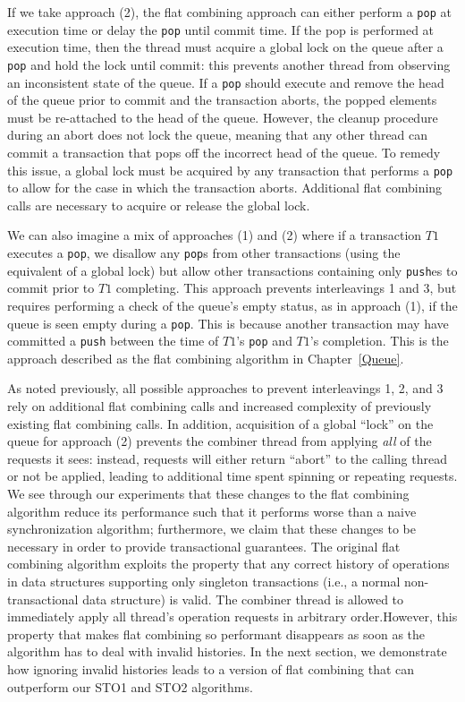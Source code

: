 If we take approach (2), the flat combining approach can either perform a \texttt{pop} at execution time or delay the \texttt{pop} until commit time. If the pop is performed at execution time, then the thread must acquire a global lock on the queue after a \texttt{pop} and hold the lock until commit: this prevents another thread from observing an inconsistent state of the queue. If a \texttt{pop} should execute and remove the head of the queue prior to commit and the transaction aborts, the popped elements must be re-attached to the head of the queue. However, the cleanup procedure during an abort does not lock the queue, meaning that any other thread can commit a transaction that pops off the incorrect head of the queue. To remedy this issue, a global lock must be acquired by any transaction that performs a \texttt{pop} to allow for the case in which the transaction aborts. Additional flat combining calls are necessary to acquire or release the global lock. 

We can also imagine a mix of approaches (1) and (2) where if a transaction $T1$ executes a \texttt{pop}, we disallow any \texttt{pop}s from other transactions (using the equivalent of a global lock) but allow other transactions containing only \texttt{push}es to commit prior to $T1$ completing. This approach prevents interleavings 1 and 3, but requires performing a check of the queue's empty status, as in approach (1), if the queue is seen empty during a \texttt{pop}. This is because another transaction may have committed a \texttt{push} between the time of $T1$'s \texttt{pop} and $T1$'s completion. This is the approach described as the flat combining algorithm in Chapter~\ref{Queue}.

As noted previously, all possible approaches to prevent interleavings 1, 2, and 3 rely on additional flat combining calls and increased complexity of previously existing flat combining calls. In addition, acquisition of a global ``lock'' on the queue for approach (2) prevents the combiner thread from applying \emph{all} of the requests it sees: instead, requests will either return ``abort'' to the calling thread or not be applied, leading to additional time spent spinning or repeating requests. We see through our experiments that these changes to the flat combining algorithm reduce its performance such that it performs worse than a naive synchronization algorithm; furthermore, we claim that these changes to be necessary in order to provide transactional guarantees. The original flat combining algorithm exploits the property that any correct history of operations in data structures supporting only singleton transactions (i.e., a normal non-transactional data structure) is valid. The combiner thread is allowed to immediately apply all thread's operation requests in arbitrary order.However, this property that makes flat combining so performant disappears as soon as the algorithm has to deal with invalid histories. In the next section, we demonstrate how ignoring invalid histories leads to a version of flat combining that can outperform our STO1 and STO2 algorithms.


